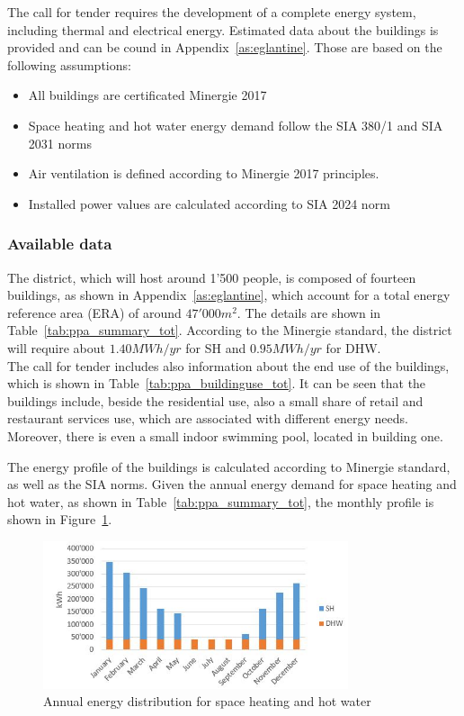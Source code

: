\documentclass{article}
\begin{document}
The call for tender requires the development of a complete energy system, including thermal and electrical energy. Estimated data about the buildings is provided and can be cound in Appendix~\ref{as:eglantine}. Those are based on the following assumptions:
\begin{itemize}
    \item All buildings are certificated Minergie 2017
    \item Space heating and hot water energy demand follow the SIA 380/1 and SIA 2031 norms
    \item Air ventilation is defined according to Minergie 2017 principles.
    \item Installed power values are calculated according to SIA 2024 norm
\end{itemize}

\subsubsection{Available data}
The district, which will host around 1'500 people, is composed of fourteen buildings, as shown in Appendix~\ref{as:eglantine}, which account for a total energy reference area (ERA) of around $47'000 m^{2}$. The details are shown in Table~\ref{tab:ppa_summary_tot}. According to the Minergie standard, the district will require about $1.40 MWh/yr$ for SH and $0.95 MWh/yr$ for DHW.\\



The call for tender includes also information about the end use of the buildings, which is shown in Table~\ref{tab:ppa_buildinguse_tot}. It can be seen that the buildings include, beside the residential use, also a small share of retail and restaurant services use, which are associated with different energy needs. Moreover, there is even a small indoor swimming pool, located in building one. 



The energy profile of the buildings is calculated according to Minergie standard, as well as the SIA norms. Given the annual energy demand for space heating and hot water, as shown in Table~\ref{tab:ppa_summary_tot}, the monthly profile is shown in Figure~\ref{fig:ppa_energydemand}.

\begin{figure}[htp]
\centering
\includegraphics[width=0.8\textwidth]{ppa_energydemand.JPG}
\caption{Annual energy distribution for space heating and hot water}
\label{fig:ppa_energydemand}
\end{figure}
\end{document}
